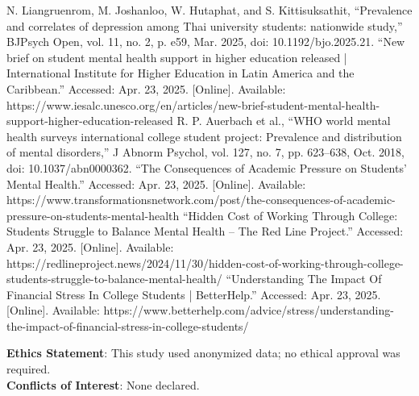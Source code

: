 \documentclass[conference]{IEEEtran}
\begin{document}
\begin{thebibliography}{00}

 N. Liangruenrom, M. Joshanloo, W. Hutaphat, and S. Kittisuksathit, “Prevalence and correlates of depression among Thai university students: nationwide study,” BJPsych Open, vol. 11, no. 2, p. e59, Mar. 2025, doi: 10.1192/bjo.2025.21.
“New brief on student mental health support in higher education released | International Institute for Higher Education in Latin America and the Caribbean.” Accessed: Apr. 23, 2025. [Online]. Available: https://www.iesalc.unesco.org/en/articles/new-brief-student-mental-health-support-higher-education-released
 R. P. Auerbach et al., “WHO world mental health surveys international college student project: Prevalence and distribution of mental disorders,” J Abnorm Psychol, vol. 127, no. 7, pp. 623–638, Oct. 2018, doi: 10.1037/abn0000362.
 “The Consequences of Academic Pressure on Students’ Mental Health.” Accessed: Apr. 23, 2025. [Online]. Available: https://www.transformationsnetwork.com/post/the-consequences-of-academic-pressure-on-students-mental-health
 “Hidden Cost of Working Through College: Students Struggle to Balance Mental Health – The Red Line Project.” Accessed: Apr. 23, 2025. [Online]. Available: https://redlineproject.news/2024/11/30/hidden-cost-of-working-through-college-students-struggle-to-balance-mental-health/
 “Understanding The Impact Of Financial Stress In College Students | BetterHelp.” Accessed: Apr. 23, 2025. [Online]. Available: https://www.betterhelp.com/advice/stress/understanding-the-impact-of-financial-stress-in-college-students/
 
\end{thebibliography}
\vspace{12pt} 

\textbf{Ethics Statement}: This study used anonymized data; no ethical approval was required. \\
\textbf{Conflicts of Interest}: None declared.
\end{document}
